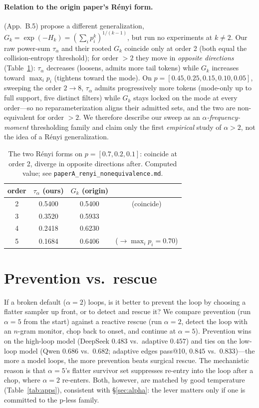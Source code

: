\documentclass[11pt]{article}                       %
\newcommand{\tsum}{\ensuremath{\textstyle\sum}}
\begin{document}
\paragraph{Relation to the origin paper's R\'enyi form.} \citet{tan2025pless} (App.\ B.5) propose a
different generalization, $G_k=\exp(-H_k)=(\tsum_i p_i^k)^{1/(k-1)}$, but run no experiments at
$k\neq2$. Our raw power-sum $\tau_\alpha$ and their rooted $G_k$ coincide only at order 2 (both equal
the collision-entropy threshold); for order $>2$ they move in \emph{opposite directions}
(Table~\ref{tab:nonequiv}): $\tau_\alpha$ decreases (loosens, admits more tail tokens) while $G_k$
increases toward $\max_i p_i$ (tightens toward the mode). On $p{=}[0.45,0.25,0.15,0.10,0.05]$, sweeping
the order $2\!\to\!8$, $\tau_\alpha$ admits progressively more tokens (mode-only up to full support,
five distinct filters) while $G_k$ stays locked on the mode at every order---so no reparameterization
aligns their admitted sets, and the two are non-equivalent for order $>2$. We therefore describe our
sweep as an \emph{$\alpha$-frequency-moment} thresholding family and claim only the first
\emph{empirical} study of $\alpha>2$, not the idea of a R\'enyi generalization.

\begin{table}[t]\centering
\caption{The two R\'enyi forms on $p{=}[0.7,0.2,0.1]$: coincide at order 2, diverge in opposite
directions after. Computed value; see \texttt{paperA\_renyi\_nonequivalence.md}.}
\label{tab:nonequiv}
\begin{tabular}{cccc}
\toprule
order & $\tau_\alpha$ (ours) & $G_k$ (origin) & \\
\midrule
2 & 0.5400 & 0.5400 & (coincide) \\
3 & 0.3520 & 0.5933 & \\
4 & 0.2418 & 0.6230 & \\
5 & 0.1684 & 0.6406 & ($\to \max_i p_i{=}0.70$) \\
\bottomrule
\end{tabular}
\end{table}

\section{Prevention vs.\ rescue}\label{sec:prevention}
If a broken default ($\alpha=2$) loops, is it better to prevent the loop by choosing a flatter sampler
up front, or to detect and rescue it? We compare prevention (run $\alpha{=}5$ from the start) against a
reactive rescue (run $\alpha{=}2$, detect the loop with an $n$-gram monitor, chop back to onset, and
continue at $\alpha{=}5$). Prevention wins on the high-loop model (DeepSeek $0.483$ vs.\ adaptive
$0.457$) and ties on the low-loop model (Qwen $0.686$ vs.\ $0.682$; adaptive edges pass@10, $0.845$
vs.\ $0.833$)---the more a model loops, the more prevention beats surgical rescue. The
mechanistic reason is that $\alpha{=}5$'s flatter survivor set suppresses re-entry into the loop after
a chop, where $\alpha{=}2$ re-enters. Both, however, are matched by good temperature (Table~\ref{tab:apps}),
consistent with \S\ref{sec:alpha}: the lever matters only if one is committed to the p-less family.
\end{document}
